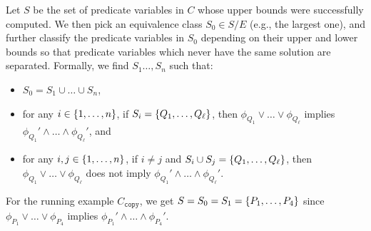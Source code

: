 Let \(S\) be the set of predicate variables in \(C\) whose upper bounds 
were successfully computed.  We then pick an equivalence class \(S_0 \in 
S / E\) (e.g., the largest one), and further classify the predicate 
variables in \(S_0\) depending on their upper and lower bounds so that 
predicate variables which never have the same solution are separated.
%
Formally, we find \(S_1\dots,S_n\) such that:
\begin{itemize}
\item \(S_0 = S_1 \cup \dots \cup S_n\),
\item for any \(i \in \{{1,\dots,n}\}\), if \(S_i = 
\{{Q_1,\dots,Q_{\ell}}\}\), then \(\phi_{Q_1} \lor \dots \lor 
\phi_{Q_{\ell}}\) implies \(\phi_{Q_1}' \land \dots \land 
\phi_{Q_{\ell}}'\), and
\item for any \(i,j \in \{{1,\dots,n}\}\), if \(i \neq j\) and 
\(S_i \cup S_j = \{{Q_1,\dots,Q_{\ell}}\}\), then \(\phi_{Q_1} \lor 
\dots \lor \phi_{Q_{\ell}}\) does not imply \(\phi_{Q_1}' \land \dots 
\land \phi_{Q_{\ell}}'\).
\end{itemize}
For the running example \(C_{\texttt{copy}}\), we get 
\(S=S_0=S_1=\{{P_1,\dots,P_4}\}\) since \(\phi_{P_1} \lor \dots \lor 
\phi_{P_4}\) implies \(\phi_{P_1}' \land \dots \land \phi_{P_4}'\).


